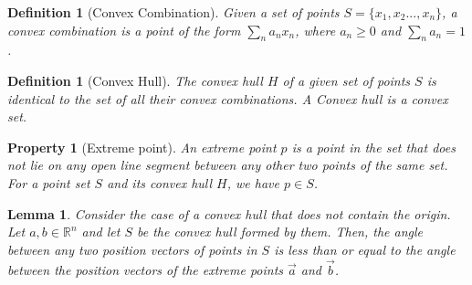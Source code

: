 \documentclass[10pt,twocolumn,letterpaper]{article}
\newtheorem{lemma}[theorem]{Lemma}
\newtheorem{definition}[theorem]{Definition}
\newtheorem{property}{Property}[theorem]
\begin{document}
\begin{definition}[Convex Combination]
Given a set of points $S=\{x_1, x_2..., x_n\}$, a convex combination is a point of the form $\sum_{n}{a_nx_n}$, where $a_n\geq0$ and $\sum_{n}{a_n}=1$.
\end{definition}

\begin{definition}[Convex Hull]
The convex hull $H$ of a given set of points $S$ is identical to the set of all their convex combinations. A Convex hull is a convex set.
\end{definition}

\begin{property}[Extreme point]
An extreme point $p$ is a point in the set that does not lie on any open line segment between any other two points of the same set. For a point set $S$ and its convex hull $H$, we have $p\in S$.
\end{property}

\begin{lemma} 
\label{lemma:two}
Consider the case of a convex hull that does not contain the origin.
Let $a, b \in \mathbb{R}^n$ and let $S$ be the convex hull formed by them. Then, the angle between any two position vectors of points in $S$ is less than or equal to the angle between the position vectors of the extreme points $\vec{a}$ and $\vec{b}$.
\end{lemma}
\end{document}
